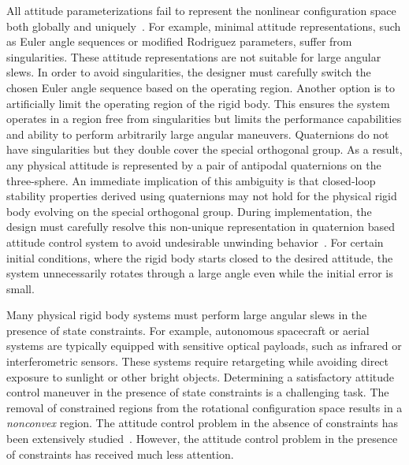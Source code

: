\documentclass[letterpaper, 10 pt, conference]{ieeeconf}  %
\begin{document}
All attitude parameterizations fail to represent the nonlinear configuration space both globally and uniquely~\cite{chaturvedi2011a}.
For example, minimal attitude representations, such as Euler angle sequences or modified Rodriguez parameters, suffer from singularities.
These attitude representations are not suitable for large angular slews.
In order to avoid singularities, the designer must carefully switch the chosen Euler angle sequence based on the operating region.
Another option is to artificially limit the operating region of the rigid body.
This ensures the system operates in a region free from singularities but limits the performance capabilities and ability to perform arbitrarily large angular maneuvers.
Quaternions do not have singularities but they double cover the special orthogonal group.
As a result, any physical attitude is represented by a pair of antipodal quaternions on the three-sphere.
An immediate implication of this ambiguity is that closed-loop stability properties derived using quaternions may not hold for the physical rigid body evolving on the special orthogonal group.
During implementation, the design must carefully resolve this non-unique representation in quaternion based attitude control system to avoid undesirable unwinding behavior~\cite{bhat2000}.
For certain initial conditions, where the rigid body starts closed to the desired attitude, the system unnecessarily rotates through a large angle even while the initial error is small.

Many physical rigid body systems must perform large angular slews in the presence of state constraints.
For example, autonomous spacecraft or aerial systems are typically equipped with sensitive optical payloads, such as infrared or interferometric sensors.
These systems require retargeting while avoiding direct exposure to sunlight or other bright objects.
Determining a satisfactory attitude control maneuver in the presence of state constraints is a challenging task.
The removal of constrained regions from the rotational configuration space results in a \textit{nonconvex} region.
The attitude control problem in the absence of constraints has been extensively studied~\cite{sanyal2008,lee2010,lee2011a}.
However, the attitude control problem in the presence of constraints has received much less attention.
\end{document}
